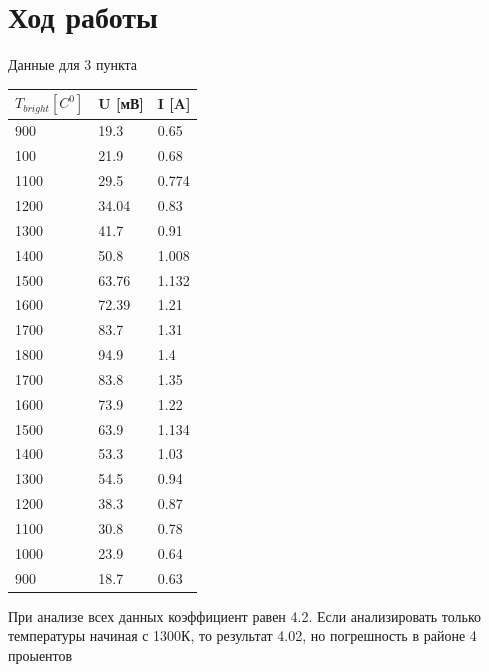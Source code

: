 \documentclass[a4paper,12pt]{article} %
\begin{document}
	\section{Ход работы}
	
	Данные для 3 пункта 
	\begin{table}[h]
		\centering
		\begin{tabular}{|l|l|l|}
		\hline
		$T_{bright} [C^{0}]$				  & U [мВ] & I [A]     \\ \hline
		900                                   & 19.3       & 0.65  \\ \hline
		100                                   & 21.9       & 0.68  \\ \hline
		1100                                  & 29.5       & 0.774 \\ \hline
		1200                                  & 34.04      & 0.83  \\ \hline
		1300                                  & 41.7       & 0.91  \\ \hline
		1400                                  & 50.8       & 1.008 \\ \hline
		1500                                  & 63.76      & 1.132 \\ \hline
		1600                                  & 72.39      & 1.21  \\ \hline
		1700                                  & 83.7       & 1.31  \\ \hline
		1800                                  & 94.9       & 1.4   \\ \hline
		1700                                  & 83.8       & 1.35  \\ \hline
		1600                                  & 73.9       & 1.22  \\ \hline
		1500                                  & 63.9       & 1.134 \\ \hline
		1400                                  & 53.3       & 1.03  \\ \hline
		1300                                  & 54.5       & 0.94  \\ \hline
		1200                                  & 38.3       & 0.87  \\ \hline
		1100                                  & 30.8       & 0.78  \\ \hline
		1000                                  & 23.9       & 0.64  \\ \hline
		900                                   & 18.7       & 0.63  \\ \hline
		\end{tabular}
	\end{table}

	При анализе всех данных коэффициент равен 4.2. Если анализировать только температуры начиная с 1300К, 
	то результат 4.02, но погрешность в районе 4 проыентов
\end{document}
